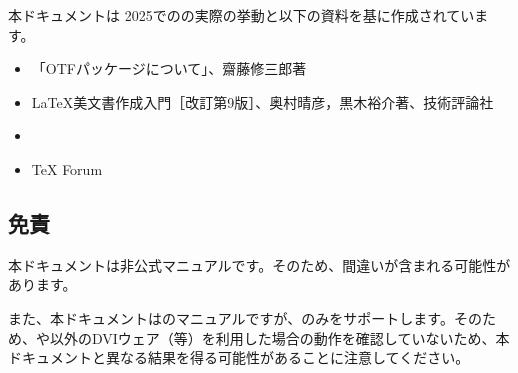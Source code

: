 \documentclass[uplatex, dvipdfmx, paper=a4paper, jis2004,
    fore-edge=19zw,
    line_length=35zw,
    sidenote_length=16zw,
    number_of_lines=38
  ]{jlreq}
\begin{document}
本ドキュメントは{\TeXLive} 2025でのの実際の挙動と以下の資料を基に作成されています。

\begin{itemize}
  \item 「OTFパッケージについて」、齋藤修三郎\hspace{0.5zw}著
  \item \LaTeX 美文書作成入門［改訂第9版］、奥村晴彦，黒木裕介\hspace{0.5zw}著、技術評論社
  \item {\TeXWiki}
  \item {\TeX} Forum 
\end{itemize}

\vfil
\subsection*{免責}

本ドキュメントは非公式マニュアルです。そのため、間違いが含まれる可能性があります。

また、本ドキュメントはのマニュアルですが、{\upLaTeXdvipdfmx}のみをサポートします。そのため、{\pLaTeX}や{\dvipdfmx}以外のDVIウェア（等）を利用した場合の動作を確認していないため、本ドキュメントと異なる結果を得る可能性があることに注意してください。

\newpage
{}
\setcounter{page}{1}
\pagestyle{plain}



\newpage










\end{document}
